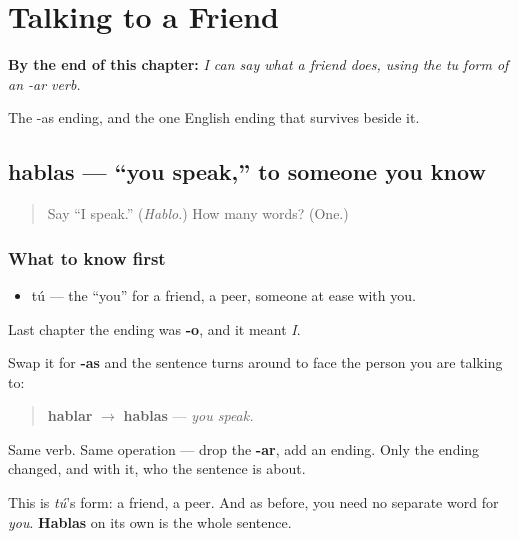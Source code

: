 
\chapter{Talking to a Friend}
\label{ch:hablas}

\begin{chapteropening}
\textbf{By the end of this chapter:} \emph{I can say what a friend does, using the tu form of an -ar verb.}

The -as ending, and the one English ending that survives beside it.
\end{chapteropening}

\section[hablas]{hablas — \textquotedblleft{}you speak,\textquotedblright{} to someone you know}

\label{lesson:ES-C06-hablas}



\begin{quote}
Say \textquotedblleft{}I speak.\textquotedblright{} (\emph{Hablo}.) How many words? (One.)
\end{quote}

\subsection*{What to know first}
\begin{itemize}
\raggedright
  \item tú — the \textquotedblleft{}you\textquotedblright{} for a friend, a peer, someone at ease with you.
\end{itemize}

\begin{grammarlens}[title={Grammar Lens: one more letter, and it is about the other person}]
Last chapter the ending was \textbf{-o}, and it meant \emph{I}.

Swap it for \textbf{-as} and the sentence turns around to face the person you are talking to:

\begin{quote}
\textbf{hablar} $\to$ \textbf{hablas} — \emph{you speak.}
\end{quote}

Same verb. Same operation — drop the \textbf{-ar}, add an ending. Only the ending changed, and with it, who the sentence is about.

This is \emph{tú}'s form: a friend, a peer. And as before, you need no separate word for \emph{you}. \textbf{Hablas} on its own is the whole sentence.
\end{grammarlens}

